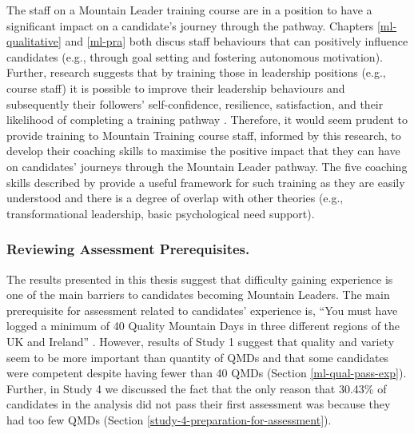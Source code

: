 \documentclass[
  12pt,
  a4paper,
]{book}
\begin{document}
The staff on a Mountain Leader training course are in a position to have a significant impact on a candidate's journey through the pathway. Chapters \ref{ml-qualitative} and \ref{ml-pra} both discus staff behaviours that can positively influence candidates (e.g., through goal setting and fostering autonomous motivation). Further, research suggests that by training those in leadership positions (e.g., course staff) it is possible to improve their leadership behaviours and subsequently their followers' self-confidence, resilience, satisfaction, and their likelihood of completing a training pathway \citep[cf.~][]{Hardy2010}. Therefore, it would seem prudent to provide training to Mountain Training course staff, informed by this research, to develop their coaching skills to maximise the positive impact that they can have on candidates' journeys through the Mountain Leader pathway. The five coaching skills described by \citet{Wagstaff2018} provide a useful framework for such training as they are easily understood and there is a degree of overlap with other theories (e.g., transformational leadership, basic psychological need support).

\hypertarget{reviewing-assessment-prerequisites.}{%
\subsubsection{Reviewing Assessment Prerequisites.}\label{reviewing-assessment-prerequisites.}}

The results presented in this thesis suggest that difficulty gaining experience is one of the main barriers to candidates becoming Mountain Leaders. The main prerequisite for assessment related to candidates' experience is, ``You must have logged a minimum of 40 Quality Mountain Days in three different regions of the UK and Ireland'' \citep[p 6]{MTUK2015a}. However, results of Study 1 suggest that quality and variety seem to be more important than quantity of QMDs and that some candidates were competent despite having fewer than 40 QMDs (Section \ref{ml-qual-pass-exp}). Further, in Study 4 we discussed the fact that the only reason that 30.43\% of candidates in the analysis did not pass their first assessment was because they had too few QMDs (Section \ref{study-4-preparation-for-assessment}).
\end{document}
